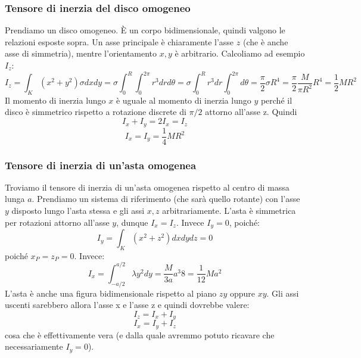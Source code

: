 \documentclass[a4paper,openany]{article}
\begin{document}
	\subsubsection{Tensore di inerzia del disco omogeneo}
	Prendiamo un disco omogeneo. È un corpo bidimensionale, quindi valgono le relazioni esposte sopra. Un asse principale è chiaramente l'asse $z$ (che è anche asse di simmetria), mentre l'orientamento $x,y$ è arbitrario. Calcoliamo ad esempio $I_z$:
	\begin{equation*}\label{key}
		I_{z} = \int_{K}(x^2+y^{2})\sigma dxdy =\sigma \int_{0}^{R}\int_{0}^{2\pi}r^{3}drd\theta = \sigma\int_{0}^{R}r^3 dr \int_{0}^{2\pi} d\theta = \dfrac{\pi}{2}\sigma R^{4} = \dfrac{\pi}{2}\dfrac{M}{\pi R^{2}}R^{4} = \dfrac{1}{2}MR^{2}
	\end{equation*}
	Il momento di inerzia lungo $x$ è uguale al momento di inerzia lungo $y$ perché il disco è simmetrico rispetto a rotazione discrete di $\pi/2$ attorno all'asse z. Quindi
	$$
	I_x + I_y = 2I_x = I_z
	$$
	$$
	I_x = I_y = \dfrac{1}{4}MR^2
	$$
	\subsubsection{Tensore di inerzia di un'asta omogenea}
	Troviamo il tensore di inerzia di un'asta omogenea rispetto al centro di massa lunga $a$. Prendiamo un sistema di riferimento (che sarà quello rotante) con l'asse $y$ disposto lungo l'asta stessa e gli assi $x,z$ arbitrariamente. L'asta è simmetrica per rotazioni attorno all'asse $y$, dunque $I_x = I_z$. Invece $I_y = 0$, poiché:
	$$
	I_y = \int_{K}(x^2+z^2)dxdydz = 0
	$$
	poiché $x_{P} = z_{P} = 0$. Invece:
	$$
	I_{x} = \int_{-a/2}^{a/2}\lambda y^2 dy = \dfrac{M}{3a}{a^3}{8} = \dfrac{1}{12}Ma^{2}
	$$
	L'asta è anche una figura bidimensionale rispetto al piano $zy$ oppure $xy$. Gli assi uscenti sarebbero allora l'asse x e l'asse z e quindi dovrebbe valere:
	$$
	I_{z} = I_{x} + I_{y}
	$$
	$$
	I_x = I_y + I_z
	$$
	cosa che è effettivamente vera (e dalla quale avremmo potuto ricavare che necessariamente $I_y = 0$).
\end{document}
